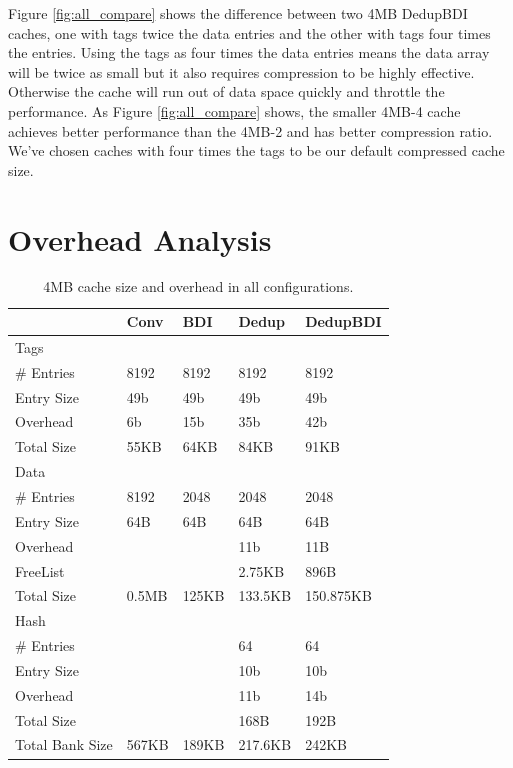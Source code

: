 Figure \ref{fig:all_compare} shows the difference between two 4MB DedupBDI caches, one with tags twice the data entries and the other with tags four times the entries. Using the tags as four times the data entries means the data array will be twice as small but it also requires compression to be highly effective. Otherwise the cache will run out of data space quickly and throttle the performance. As Figure \ref{fig:all_compare} shows, the smaller 4MB-4 cache achieves better performance than the 4MB-2 and has better compression ratio. We've chosen caches with four times the tags to be our default compressed cache size.


\section{Overhead Analysis}
\label{sec:Overhead}
\begin{table}[]
    \centering
    \begin{tabular}{lllll}
               & Conv   & BDI    & Dedup  & DedupBDI \\ \hline
    Tags       &        &        &        &          \\
    \# Entries & 8192   & 8192   & 8192   & 8192     \\
    Entry Size & 49b    & 49b    & 49b    & 49b      \\
    Overhead   & 6b     & 15b    & 35b    & 42b      \\
    Total Size & 55KB   & 64KB   & 84KB   & 91KB     \\ \hline
    Data       &        &        &        &          \\
    \# Entries & 8192   & 2048   & 2048   & 2048     \\
    Entry Size & 64B    & 64B    & 64B    & 64B      \\
    Overhead   &        &        & 11b    & 11B      \\
    FreeList   &        &        & 2.75KB & 896B     \\
    Total Size & 0.5MB  & 125KB  & 133.5KB & 150.875KB   \\ \hline
    Hash       &        &        &        &          \\
    \# Entries &        &        & 64     & 64       \\
    Entry Size &        &        & 10b    & 10b      \\
    Overhead   &        &        & 11b    & 14b      \\
    Total Size &        &        & 168B   & 192B     \\ \hline
    Total Bank Size & 567KB & 189KB & 217.6KB & 242KB  
    \end{tabular}
    \caption{4MB cache size and overhead in all configurations.}
    \label{tab:overhead}
\end{table}
